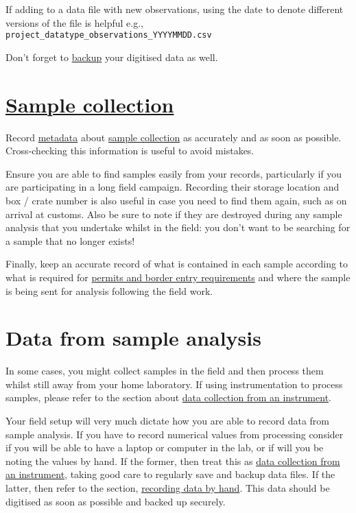 \documentclass[12pt,a4paper,oneside]{report}
\begin{document}
If adding to a data file with new observations, using the date to denote
different versions of the file is helpful e.g.,
\texttt{project\_datatype\_observations\_YYYYMMDD.csv}

Don't forget to \protect\hyperlink{backing-up-data}{backup} your
digitised data as well.

\hypertarget{sample-collection}{%
\section{\texorpdfstring{\protect\hyperlink{collecting-samples}{Sample
collection}}{Sample collection}}\label{sample-collection}}

Record \protect\hyperlink{metadata}{metadata} about
\protect\hyperlink{collecting-samples}{sample collection} as accurately
and as soon as possible. Cross-checking this information is useful to
avoid mistakes.

Ensure you are able to find samples easily from your records,
particularly if you are participating in a long field campaign.
Recording their storage location and box / crate number is also useful
in case you need to find them again, such as on arrival at customs. Also
be sure to note if they are destroyed during any sample analysis that
you undertake whilst in the field: you don't want to be searching for a
sample that no longer exists!

Finally, keep an accurate record of what is contained in each sample
according to what is required for
\protect\hyperlink{travel-and-customs}{permits and border entry
requirements} and where the sample is being sent for analysis following
the field work.

\hypertarget{data-from-sample-analysis}{%
\section{Data from sample analysis}\label{data-from-sample-analysis}}

In some cases, you might collect samples in the field and then process
them whilst still away from your home laboratory. If using
instrumentation to process samples, please refer to the section about
\protect\hyperlink{data-collection-from-an-instrument}{data collection
from an instrument}.

Your field setup will very much dictate how you are able to record data
from sample analysis. If you have to record numerical values from
processing consider if you will be able to have a laptop or computer in
the lab, or if will you be noting the values by hand. If the former,
then treat this as
\protect\hyperlink{data-collection-from-an-instrument}{data collection
from an instrument}, taking good care to regularly save and backup data
files. If the latter, then refer to the section,
\protect\hyperlink{recording-data-by-hand}{recording data by hand}. This
data should be digitised as soon as possible and backed up securely.
\end{document}

